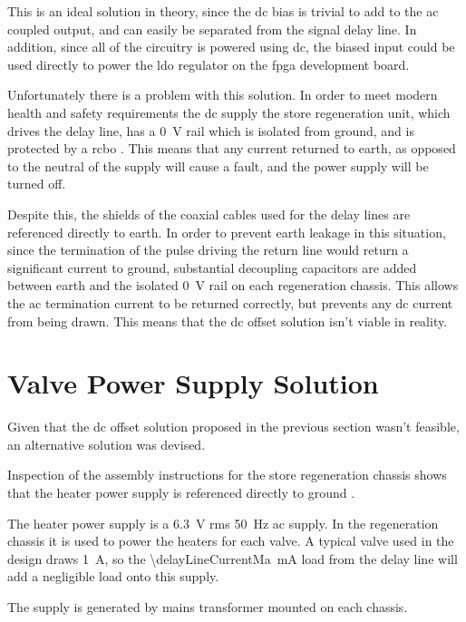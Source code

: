 This is an ideal solution in theory, since the \gls{dc} bias is trivial to add to the \gls{ac} coupled output, and can easily be separated from the signal delay line. In addition, since all of the circuitry is powered using \gls{dc}, the biased input could be used directly to power the \gls{ldo} regulator on the \gls{fpga} development board.

Unfortunately there is a problem with this solution. In order to meet modern health and safety requirements the \gls{dc} supply the store regeneration unit, which drives the delay line, has a \SI{0}{\volt} rail which is isolated from ground, and is protected by a \gls{rcbo} \cite{passmore2015}. This means that any current returned to earth, as opposed to the neutral of the supply will cause a fault, and the power supply will be turned off.

Despite this, the shields of the coaxial cables used for the delay lines are referenced directly to earth. In order to prevent earth leakage in this situation, since the termination of the pulse driving the return line would return a significant current to ground, substantial decoupling capacitors are added between earth and the isolated \SI{0}{\volt} rail on each regeneration chassis. This allows the \gls{ac} termination current to be returned correctly, but prevents any \gls{dc} current from being drawn. This means that the \gls{dc} offset solution isn't viable in reality.

\section{Valve Power Supply Solution} \label{sec:power-valve-supply}

Given that the \gls{dc} offset solution proposed in the previous section wasn't feasible, an alternative solution was devised.

Inspection of the assembly instructions for the store regeneration chassis shows that the heater power supply is referenced directly to ground \cite{burton2014a}.

The heater power supply is a \SI{6.3}{\volt} \gls{rms} \SI{50}{\hertz} \gls{ac} supply. In the regeneration chassis it is used to power the heaters for each valve. A typical valve used in the design draws \SI{1}{\ampere}, so the \SI{\delayLineCurrentMa}{\milli\ampere} load from the delay line will add a negligible load onto this supply.

The supply is generated by mains transformer mounted on each chassis.

